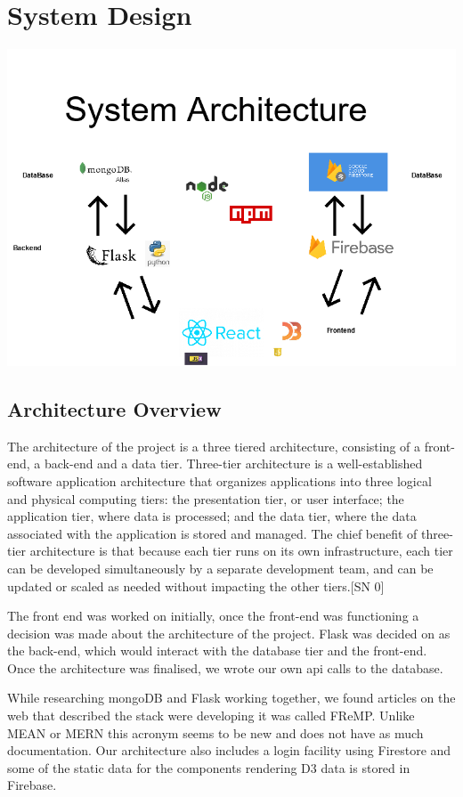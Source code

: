 \chapter{System Design}
\begin{center}    
      \includegraphics[scale=0.5]{img/basic architecture.png}
\end{center}

\section{Architecture Overview}
The architecture of the project is a three tiered architecture, consisting of a front-end, a back-end and a data tier.
Three-tier architecture is a well-established software application architecture that organizes applications into three logical and physical computing tiers: the presentation tier, or user interface; the application tier, where data is processed; and the data tier, where the data associated with the application is stored and managed.
The chief benefit of three-tier architecture is that because each tier runs on its own infrastructure, each tier can be developed simultaneously by a separate development team, and can be updated or scaled as needed without impacting the other tiers.[SN 0]

The front end was worked on initially, once the front-end was functioning a decision was made about the architecture of the project. Flask was decided on as the back-end, which would interact with the database tier and the front-end.
Once the architecture was finalised, we wrote our own api calls to the database. 


While researching mongoDB and Flask working together, we found articles on the web that described the stack were developing it was called FReMP. Unlike MEAN or MERN this acronym seems to be new and does not have as much documentation. Our architecture also includes a login facility using Firestore and some of the static data for the components rendering D3 data is stored in Firebase. 

